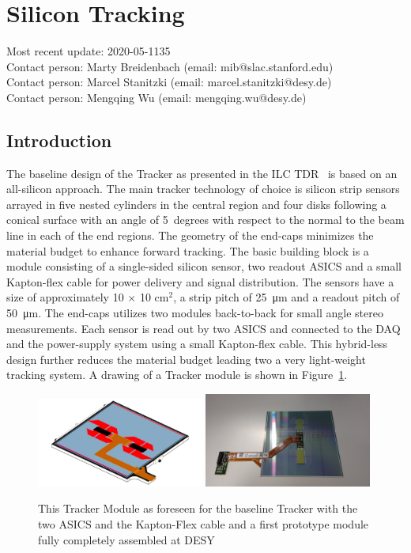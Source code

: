 \section{\KPIX Silicon Tracking}
Most recent update: 2020-05-1135 \\
Contact person: Marty Breidenbach (email: mib@slac.stanford.edu)\\
Contact person: Marcel Stanitzki (email: marcel.stanitzki@desy.de)\\
Contact person: Mengqing Wu (email: mengqing.wu@desy.de)\\

\subsection{Introduction}
The baseline design of the \SID Tracker as presented in the ILC TDR~\cite{Behnke:2013lya} is based on an all-silicon approach.
The main tracker technology of choice is silicon strip sensors arrayed in five nested cylinders in the central
region and four disks following a conical surface with an angle of 5~degrees with respect to the normal to the 
beam line in each of the end regions. The geometry of the end-caps minimizes the material budget to enhance 
forward tracking. The basic building block is a module consisting of a single-sided silicon sensor, two \KPIX readout ASICS and a small Kapton-flex cable
for power delivery and signal distribution.
The sensors have a size of approximately 10 $\times$ 10 cm$^2$, a strip pitch of \SI{25}{\micro\meter} and a readout pitch of \SI{50}{\micro\meter}.
The end-caps utilizes two modules back-to-back for small angle stereo measurements. 
Each sensor is read out by two \KPIX ASICS and connected to the DAQ and the power-supply system using a small Kapton-flex cable. This hybrid-less design 
further reduces the material budget leading two a very light-weight tracking system. A drawing of a Tracker module is shown in 
Figure~\ref{fig:SiliconTracking:KPIX:module}.
\begin{figure}
\includegraphics[width=0.49\textwidth]{Tracker/KPIX/Tracker_Module_SiD_Drawing.png}
\includegraphics[width=0.49\textwidth]{Tracker/KPIX/Tracker_Module_SiD_Photo.jpg}
\caption{This \SID Tracker Module as foreseen for the baseline \SID Tracker\cite{Behnke:2013lya} with the two \KPIX ASICS and the Kapton-Flex cable 
and a first prototype module fully completely assembled at DESY}
\label{fig:SiliconTracking:KPIX:module}
\end{figure}

